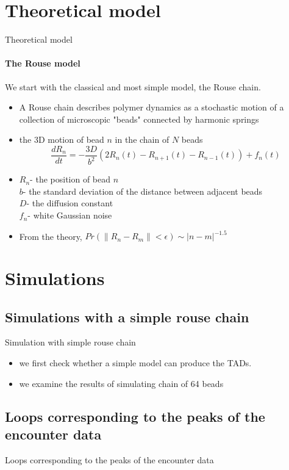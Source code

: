 \documentclass[8pt]{beamer}
\begin{document}
\section{Theoretical model}\label{section_theoreticalModel}
\begin{frame}{Theoretical model}
\framesubtitle{The Rouse model}
We start with the classical and most simple model, the Rouse chain.
\begin{itemize}
\item A Rouse chain describes polymer dynamics as a stochastic motion of a collection of microscopic "beads" connected by harmonic springs
\item the 3D  motion of bead $n$ in the chain of $N$ beads 
\begin{equation*}
\frac{dR_n}{dt} = -\frac{3D}{b^2}(2R_n(t)-R_{n+1}(t)-R_{n-1}(t))+f_n(t)
\end{equation*}
\item $R_n$- the position of bead $n$\\
$b$- the standard deviation of the distance between adjacent beads\\
$D$- the diffusion constant\\
$f_n$- white Gaussian noise
\item From the theory, $Pr(\|R_n-R_m\|<\epsilon)\sim  |n-m|^{-1.5}$
\end{itemize}
\end{frame}

\section{Simulations}
\subsection{Simulations with a simple rouse chain}
\begin{frame}{Simulation with simple rouse chain}
\begin{itemize}
\item we first check whether a simple model can produce the TADs. 
\item we examine the results of simulating  chain of 64 beads
\end{itemize}

\end{frame}

\subsection{Loops corresponding to the peaks of the encounter data}
\begin{frame}{Loops corresponding to the peaks of the encounter data}

\end{frame}
\end{document}

